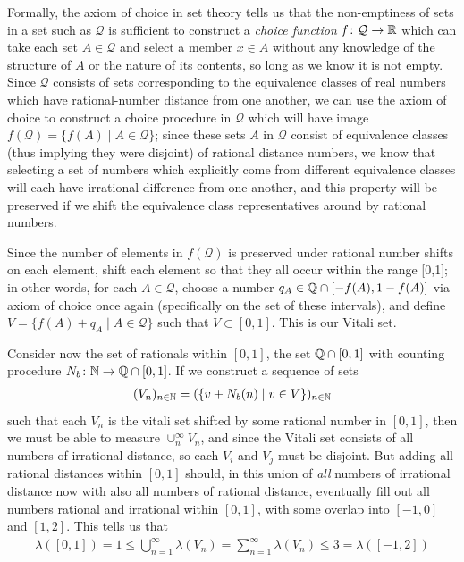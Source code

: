 \documentclass[11pt]{article}
\begin{document}
Formally, the axiom of choice in set theory tells us that the non-emptiness of sets in a set such as $\mathcal Q$ is sufficient to construct a \emph{choice function} $f \colon \mathcal Q \to \mathbb{R}$ which can take each set $A \in \mathcal Q$ and select a member $x \in A$ without any knowledge of the structure of $A$ or the nature of its contents, so long as we know it is not empty. Since $\mathcal Q$ consists of sets corresponding to the equivalence classes of real numbers which have rational-number distance from one another, we can use the axiom of choice to construct a choice procedure in $\mathcal Q$ which will have image $f(\mathcal Q) = \{f(A) \mid A \in \mathcal Q\}$; since these sets $A$ in $\mathcal Q$ consist of equivalence classes (thus implying they were disjoint) of rational distance numbers, we know that selecting a set of numbers which explicitly come from different equivalence classes will each have irrational difference from one another, and this property will be preserved if we shift the equivalence class representatives around by rational numbers.

Since the number of elements in $f(\mathcal Q)$ is preserved under rational number shifts on each element, shift each element so that they all occur within the range [0,1]; in other words, for each $A \in \mathcal Q$, choose a number $q_A \in \mathbb{Q} \cap [- f(A),1 - f(A)]$ via axiom of choice once again (specifically on the set of these intervals), and define $V = \{f(A) + q_A \mid A \in \mathcal Q \}$ such that $V \subset [0,1]$. This is our Vitali set.

Consider now the set of rationals within $[0,1]$, the set $\mathbb{Q} \cap [0,1]$ with counting procedure $N_b \colon \mathbb{N} \to \mathbb{Q} \cap [0,1]$. If we construct a sequence of sets \begin{gather*}
(V_n)_{n \in \mathbb{N}} = (\{v + N_b(n) \mid v \in V\})_{n \in \mathbb{N}} 
\end{gather*}
such that each $V_n$ is the vitali set shifted by some rational number in $[0,1]$, then we must be able to measure $\cup_n^\infty V_n$, and since the Vitali set consists of all numbers of irrational distance, so each $V_i$ and $V_j$ must be disjoint. But adding all rational distances within $[0,1]$ should, in this union of \emph{all} numbers of irrational distance now with also all numbers of rational distance, eventually fill out all numbers rational and irrational within $[0,1]$, with some overlap into $[-1,0]$ and $[1,2]$. This tells us that \begin{gather*}
 \lambda([0,1])= 1 \le \bigcup_{n=1}^\infty \lambda (V_n) = \sum_{n=1}^\infty \lambda(V_n) \le 3 = \lambda([-1,2])
\end{gather*}
\end{document}
